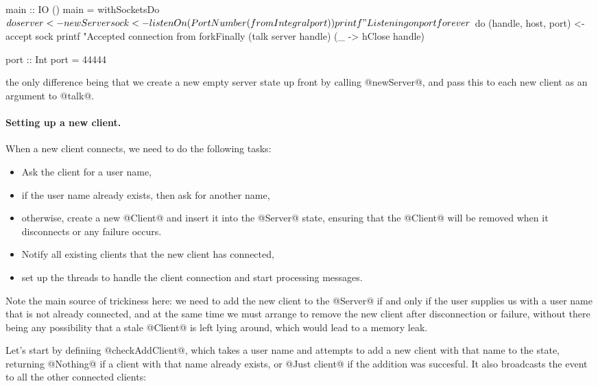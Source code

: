 \begin{haskell}
main :: IO ()
main = withSocketsDo $ do
  server <- newServer
  sock <- listenOn (PortNumber (fromIntegral port))
  printf "Listening on port %
  forever $ do
      (handle, host, port) <- accept sock
      printf "Accepted connection from %
      forkFinally (talk server handle)
                  (\_ -> hClose handle)

port :: Int
port = 44444
\end{haskell}

\noindent the only difference being that we create a new empty server
state up front by calling @newServer@, and pass this to each new
client as an argument to @talk@.

\paragraph{Setting up a new client.} When a new client connects, we
need to do the following tasks:

\begin{itemize}
\item Ask the client for a user name,
\item if the user name already exists, then ask for another name,
\item otherwise, create a new @Client@ and insert it into the @Server@
  state, ensuring that the @Client@ will be removed when it
  disconnects or any failure occurs.
\item Notify all existing clients that the new client has connected,
\item set up the threads to handle the client connection and start
  processing messages.
\end{itemize}

Note the main source of trickiness here: we need to add the new client
to the @Server@ if and only if the user supplies us with a user name
that is not already connected, and at the same time we must arrange to
remove the new client after disconnection or failure, without there
being any possibility that a stale @Client@ is left lying around,
which would lead to a memory leak.

Let's start by definiing @checkAddClient@, which takes a user name and
attempts to add a new client with that name to the state, returning
@Nothing@ if a client with that name already exists, or @Just client@
if the addition was succesful.  It also broadcasts the event to all
the other connected clients:

